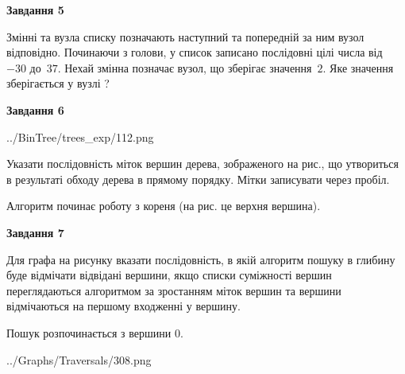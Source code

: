 \documentclass[12pt, ukrainian]{article}
\begin{document}
{\begin {large}
{\begin {center}\textbf{Завдання 5}\end {center}}\par
Змінні  та  вузла списку позначають наступний та попередній за ним вузол відповідно. Починаючи з голови, у список записано послідовні цілі числа від~$-30$ до~$37$. Нехай змінна  позначає вузол, що зберігає значення~$2$.
Яке значення зберігається у вузлі  ?\par
\newpage

{\begin {center}\textbf{Завдання 6}\end {center}}\par

\begin{center}
	{../BinTree/trees_exp/112.png}
\end{center}
Указати послідовність міток вершин дерева, зображеного на рис., що утвориться в результаті обходу дерева в прямому порядку. Мітки записувати через пробіл.\par Алгоритм починає роботу з кореня (на рис. це верхня вершина).\par
\newpage

{\begin {center}\textbf{Завдання 7}\end {center}}\par
Для графа на рисунку вказати послідовність, в якій алгоритм пошуку в глибину буде відмічати відвідані вершини, якщо списки суміжності вершин переглядаються алгоритмом за зростанням міток вершин та вершини відмічаються на першому вход\-женні у вершину.\par
Пошук розпочинається з вершини 0.\par

\begin{center}
	{../Graphs/Traversals/308.png}
\end{center}\par
\newpage


\end{large}}
\end{document}

